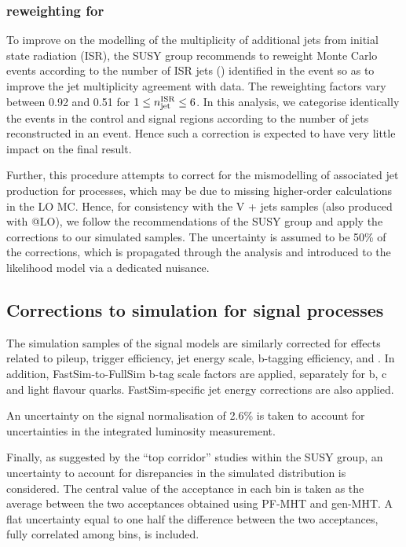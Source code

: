 \subsubsection{\texorpdfstring{\nisr}{Nisr} reweighting for \texorpdfstring{\ttbar}{TTbar}}
\label{sec:nisr-intro}
 
To improve on the \MADGRAPH modelling of the multiplicity of
additional jets from initial state radiation (ISR), the SUSY group
recommends to reweight \MADGRAPH \ttbar Monte Carlo events according
to the number of ISR jets (\nisr) identified in the event so as to
improve the jet multiplicity agreement with data. The reweighting
factors vary between 0.92 and 0.51 for $1 \leq n_\textrm{jet}^\mathrm{ISR} \leq 6$. In this
analysis, we categorise identically the events in the control and
signal regions according to the number of jets reconstructed in an
event. Hence such a correction is expected to have very little impact
on the final result.

Further, this procedure attempts to correct for the mismodelling of
associated jet production for \ttbar processes, which may be due to
missing higher-order calculations in the LO \MADGRAPH MC. Hence, for
consistency with the V + jets samples (also produced with
\MADGRAPH{}@LO), we follow the recommendations of the SUSY group and
apply the \nisr corrections to our simulated samples. The uncertainty
is assumed to be 50\% of the corrections, which is propagated through
the analysis and introduced to the likelihood model via a dedicated
nuisance.

\subsection{Corrections to simulation for signal processes}
\label{sec:signalcorrs}

The simulation samples of the signal models are similarly corrected
for effects related to pileup, trigger efficiency, jet energy scale,
b-tagging efficiency, and \nisr. In addition, FastSim-to-FullSim 
b-tag scale factors are applied, separately for b, c and light 
flavour quarks. FastSim-specific jet energy corrections are also 
applied.

An uncertainty on the signal normalisation of 2.6\% is taken to
account for uncertainties in the integrated luminosity measurement.

Finally, as suggested by the ``top corridor'' studies within the SUSY
group, an uncertainty to account for disrepancies in the simulated
\met distribution is considered. The central value of the acceptance in
each bin is taken as the average between the two acceptances obtained
using PF-MHT and gen-MHT. A flat uncertainty equal to one half the
difference between the two acceptances, fully correlated among bins,
is included.

